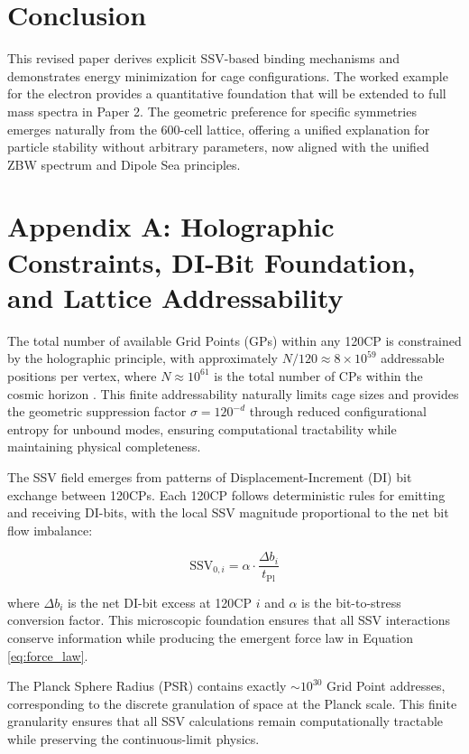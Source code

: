 \documentclass[11pt]{article}
\begin{document}
\section{Conclusion}

This revised paper derives explicit SSV-based binding mechanisms and demonstrates energy minimization for cage configurations. The worked example for the electron provides a quantitative foundation that will be extended to full mass spectra in Paper 2. The geometric preference for specific symmetries emerges naturally from the 600-cell lattice, offering a unified explanation for particle stability without arbitrary parameters, now aligned with the unified ZBW spectrum and Dipole Sea principles.

\appendix

\section{Appendix A: Holographic Constraints, DI-Bit Foundation, and Lattice Addressability}

The total number of available Grid Points (GPs) within any 120CP is constrained by the holographic principle, with approximately $N/120 \approx 8 \times 10^{59}$ addressable positions per vertex, where $N \approx 10^{61}$ is the total number of CPs within the cosmic horizon \cite{polkinghorne2002}. This finite addressability naturally limits cage sizes and provides the geometric suppression factor $\sigma = 120^{-d}$ through reduced configurational entropy for unbound modes, ensuring computational tractability while maintaining physical completeness.

The SSV field emerges from patterns of Displacement-Increment (DI) bit exchange between 120CPs. Each 120CP follows deterministic rules for emitting and receiving DI-bits, with the local SSV magnitude proportional to the net bit flow imbalance:

\begin{equation}
\text{SSV}_{0,i} = \alpha \cdot \frac{\Delta b_i}{t_{\text{Pl}}}
\end{equation}

where $\Delta b_i$ is the net DI-bit excess at 120CP $i$ and $\alpha$ is the bit-to-stress conversion factor. This microscopic foundation ensures that all SSV interactions conserve information while producing the emergent force law in Equation \eqref{eq:force_law}.

The Planck Sphere Radius (PSR) contains exactly $\sim 10^{30}$ Grid Point addresses, corresponding to the discrete granulation of space at the Planck scale. This finite granularity ensures that all SSV calculations remain computationally tractable while preserving the continuous-limit physics.
\end{document}
